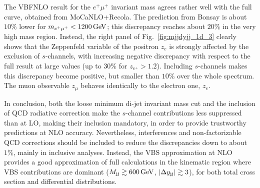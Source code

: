 %
The {\sc VBFNLO} result for the $e^+\mu^+$ invariant mass agrees rather well with the full curve, obtained from {\sc MoCa\-NLO+Recola}.
The prediction from {\sc Bonsay} is about $10\%$ lower for $m_{e^+\mu^+}<1200 \,\text{GeV}$; this discrepancy reaches about $20\%$ in the very high mass region. 
Instead, the right panel of Fig.~\ref{fig:mjjdyjj_1d_3} clearly shows that the Zeppenfeld variable of the positron $z_e$ is strongly affected by the exclusion of $s$-channels, with increasing negative discrepancy with respect to the full result at large values (up to $30\%$ for $z_{e^+}>1.2$). Including $s$-channels makes this discrepancy become positive, but smaller than $10\%$ over the whole spectrum.
The muon observable $z_{\mu}$ behaves identically to the electron one, $z_e$.

In conclusion, both the loose minimum di-jet invariant mass cut and the inclusion of QCD radiative correction make the $s$-channel contributions less suppressed than at LO, making their inclusion mandatory, in order to provide trustworthy predictions at NLO accuracy.
Nevertheless, interferences and non-factorizable QCD corrections should be included to reduce the discrepancies down to about $1\%$, mainly in inclusive analyses.
Instead, the VBS approximation at NLO provides a good approximation of full calculations in the kinematic region where VBS contributions are dominant ($M_{\text{j}\text{j}} \gtrsim 600 \,\text{GeV}$, $|\Delta y_{\text{j}\text{j}}| \gtrsim 3$), for both total cross section and differential distributions.
